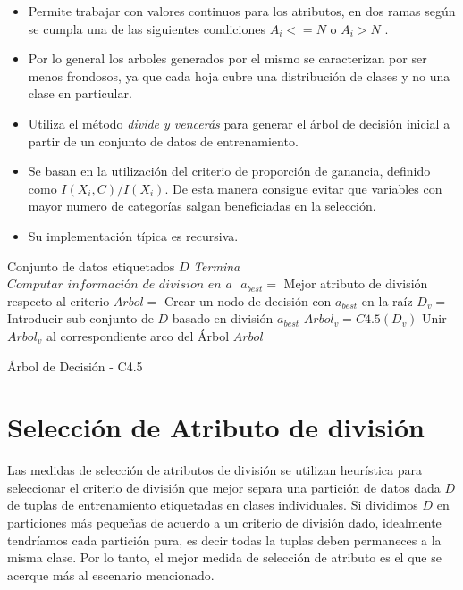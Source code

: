 \begin{itemize}
	\item Permite trabajar con valores continuos para los atributos, en dos ramas según se cumpla una de las siguientes condiciones  $ A_{i} <= N $ o $ A_{i} > N $ . 
	\item Por lo general los arboles generados por el mismo se caracterizan por ser menos frondosos, ya que cada hoja cubre una distribución de clases y no una clase en particular.
	\item Utiliza el método \emph{divide y vencerás} para generar el árbol de decisión inicial a partir de un conjunto de datos de entrenamiento.
	\item Se basan en la utilización del criterio de proporción de ganancia, definido como $ I(X_{i},C) / I(X_{i})  $. De esta manera consigue evitar que variables con mayor numero de categorías salgan beneficiadas en la selección. 
	\item Su implementación típica es recursiva.
\end{itemize}

\begin{algorithm}
	\begin{algorithmic}[1]
		\Require Conjunto de datos etiquetados $D$
				\State\textit{Termina}
			\EndIf
				\State $\textit{Computar información de division en a }$
			\EndFor
			\State $ a_{best} =$ Mejor atributo de división respecto al criterio 
			\State $ Arbol =$ Crear un nodo de decisión con $ a_{best} $ en la raíz 
			\State $ D_{v} =$ Introducir sub-conjunto de $D$ basado en división $ a_{best} $
				\State $ Arbol_{v} = C4.5(D_{v}) $
				\State Unir $ Arbol_{v} $ al correspondiente arco del Árbol
			\EndFor
			\State 
			\Return $ Arbol $
		\EndProcedure
	\end{algorithmic}
	\caption{\label{algoC45}Árbol de Decisión - C4.5}
\end{algorithm}


\section{Selección de Atributo de división}
Las medidas de selección de atributos de división se utilizan heurística para seleccionar el criterio de división que mejor separa una partición de datos dada $D$ de tuplas de entrenamiento etiquetadas en clases individuales. Si dividimos $D$ en particiones más pequeñas de acuerdo a un criterio de división dado, idealmente tendríamos cada partición pura, es decir todas la tuplas deben permaneces a la misma clase. Por lo tanto, el mejor medida de selección de atributo es el que se acerque más al escenario mencionado.

